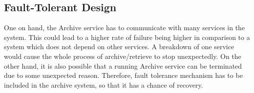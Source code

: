         \subsection{Fault-Tolerant Design}   
        One on hand, the Archive service has to communicate with many services in the system. This could lead to a higher rate of failure being higher
        in comparison to a system which does not depend on other services. A breakdown 
        of one service would cause the whole process of archive/retrieve to stop unexpectedly. On the other hand, it is also possible that a running Archive service can be terminated
        due to some unexpected reason. Therefore, fault tolerance mechanism has to be included in the archive system, so that it has a chance of 
        recovery. 
